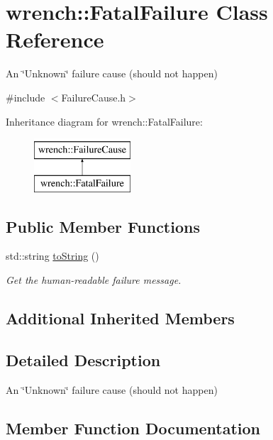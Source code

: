 \hypertarget{classwrench_1_1_fatal_failure}{}\section{wrench\+:\+:Fatal\+Failure Class Reference}
\label{classwrench_1_1_fatal_failure}


An \char`\"{}\+Unknown\char`\"{} failure cause (should not happen)  




{\ttfamily \#include $<$Failure\+Cause.\+h$>$}

Inheritance diagram for wrench\+:\+:Fatal\+Failure\+:\begin{figure}[H]
\begin{center}
\leavevmode
\includegraphics[height=2.000000cm]{classwrench_1_1_fatal_failure}
\end{center}
\end{figure}
\subsection*{Public Member Functions}
\begin{DoxyCompactItemize}
\item 
std\+::string \hyperlink{classwrench_1_1_fatal_failure_a4b547da3bac56b7b23aeba34c2dbbd39}{to\+String} ()
\begin{DoxyCompactList}\small\item\em Get the human-\/readable failure message. \end{DoxyCompactList}\end{DoxyCompactItemize}
\subsection*{Additional Inherited Members}


\subsection{Detailed Description}
An \char`\"{}\+Unknown\char`\"{} failure cause (should not happen) 

\subsection{Member Function Documentation}
\mbox{\label{classwrench_1_1_fatal_failure_a4b547da3bac56b7b23aeba34c2dbbd39}} 
